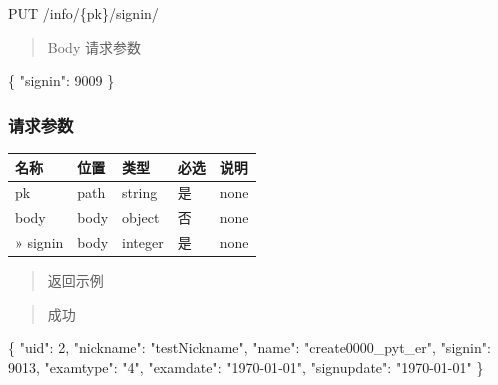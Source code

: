 \documentclass[
]{article}
\newenvironment{Shaded}{}{}
\newcommand{\DataTypeTok}[1]{\textcolor[rgb]{0.56,0.13,0.00}{#1}}
\newcommand{\DecValTok}[1]{\textcolor[rgb]{0.25,0.63,0.44}{#1}}
\newcommand{\FunctionTok}[1]{\textcolor[rgb]{0.02,0.16,0.49}{#1}}
\newcommand{\StringTok}[1]{\textcolor[rgb]{0.25,0.44,0.63}{#1}}
\begin{document}
PUT /info/\{pk\}/signin/

\begin{quote}
Body 请求参数
\end{quote}

\begin{Shaded}
\begin{Highlighting}[]
\FunctionTok{\{}
  \DataTypeTok{"signin"}\FunctionTok{:} \DecValTok{9009}
\FunctionTok{\}}
\end{Highlighting}
\end{Shaded}

\hypertarget{ux8bf7ux6c42ux53c2ux6570-37}{%
\subsubsection{请求参数}\label{ux8bf7ux6c42ux53c2ux6570-37}}

\begin{longtable}[]{@{}lllll@{}}
\toprule
名称 & 位置 & 类型 & 必选 & 说明 \\
\midrule
\endhead
pk & path & string & 是 & none \\
body & body & object & 否 & none \\
» signin & body & integer & 是 & none \\
\bottomrule
\end{longtable}

\begin{quote}
返回示例
\end{quote}

\begin{quote}
成功
\end{quote}

\begin{Shaded}
\begin{Highlighting}[]
\FunctionTok{\{}
  \DataTypeTok{"uid"}\FunctionTok{:} \DecValTok{2}\FunctionTok{,}
  \DataTypeTok{"nickname"}\FunctionTok{:} \StringTok{"testNickname"}\FunctionTok{,}
  \DataTypeTok{"name"}\FunctionTok{:} \StringTok{"create0000\_pyt\_er"}\FunctionTok{,}
  \DataTypeTok{"signin"}\FunctionTok{:} \DecValTok{9013}\FunctionTok{,}
  \DataTypeTok{"examtype"}\FunctionTok{:} \StringTok{"4"}\FunctionTok{,}
  \DataTypeTok{"examdate"}\FunctionTok{:} \StringTok{"1970{-}01{-}01"}\FunctionTok{,}
  \DataTypeTok{"signupdate"}\FunctionTok{:} \StringTok{"1970{-}01{-}01"}
\FunctionTok{\}}
\end{Highlighting}
\end{Shaded}
\end{document}
